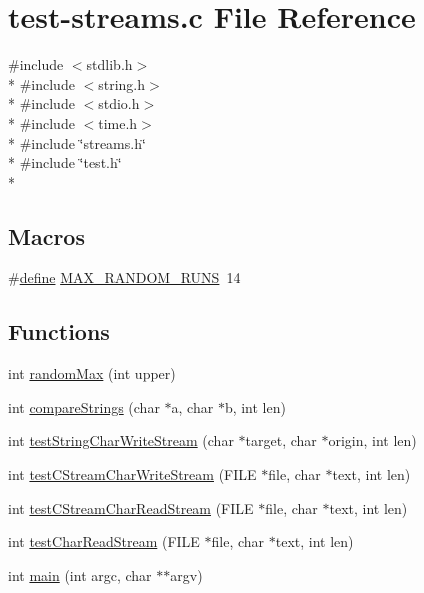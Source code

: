 \hypertarget{test-streams_8c}{\section{test-\/streams.c File Reference}
\label{test-streams_8c}
}
{\ttfamily \#include $<$stdlib.\+h$>$}\\*
{\ttfamily \#include $<$string.\+h$>$}\\*
{\ttfamily \#include $<$stdio.\+h$>$}\\*
{\ttfamily \#include $<$time.\+h$>$}\\*
{\ttfamily \#include \char`\"{}streams.\+h\char`\"{}}\\*
{\ttfamily \#include \char`\"{}test.\+h\char`\"{}}\\*
\subsection*{Macros}
\begin{DoxyCompactItemize}
\item 
\#\hyperlink{nativefunctions_8h_a06f28a72fd48e4a07d1d9e541bad304a}{define} \hyperlink{test-streams_8c_a1b9ccf4fcafb1e54dcb6d3132ef07e08}{M\+A\+X\+\_\+\+R\+A\+N\+D\+O\+M\+\_\+\+R\+U\+N\+S}~14
\end{DoxyCompactItemize}
\subsection*{Functions}
\begin{DoxyCompactItemize}
\item 
int \hyperlink{test-streams_8c_a1af844ad2671b71bc52cf4b4e91092d4}{random\+Max} (int upper)
\item 
int \hyperlink{test-streams_8c_a3a81a30f3b0b6f8dcf687a48d09bf100}{compare\+Strings} (char $\ast$a, char $\ast$b, int len)
\item 
int \hyperlink{test-streams_8c_ae2cf1752f181cbe40473261ff1e297df}{test\+String\+Char\+Write\+Stream} (char $\ast$target, char $\ast$origin, int len)
\item 
int \hyperlink{test-streams_8c_a5b0b2774522846e2cc57f3937a045e85}{test\+C\+Stream\+Char\+Write\+Stream} (F\+I\+L\+E $\ast$file, char $\ast$text, int len)
\item 
int \hyperlink{test-streams_8c_a0136d1b30a581566c09117710de754b8}{test\+C\+Stream\+Char\+Read\+Stream} (F\+I\+L\+E $\ast$file, char $\ast$text, int len)
\item 
int \hyperlink{test-streams_8c_ae4fd5062513fe4efb2f945f4edebae9c}{test\+Char\+Read\+Stream} (F\+I\+L\+E $\ast$file, char $\ast$text, int len)
\item 
int \hyperlink{test-streams_8c_a3c04138a5bfe5d72780bb7e82a18e627}{main} (int argc, char $\ast$$\ast$argv)
\end{DoxyCompactItemize}
